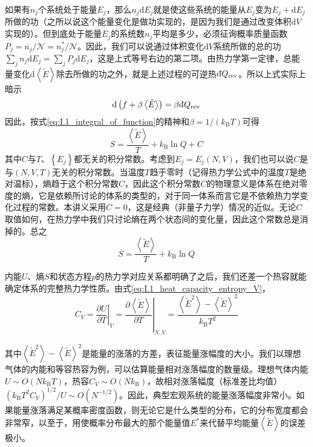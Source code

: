 \documentclass[main.tex]{subfiles}
\begin{document}
如果有$n_j$个系统处于能量$E_j$，那么$n_j\mathrm{d}E_j$就是使这些系统的能量从$E_j$变为$E_j+\mathrm{d}E_j$所做的功（之所以说这个能量变化是做功实现的，是因为我们是通过改变体积$\mathrm{d}V$实现的）。但到底处于能量$E_j$的系统数$n_j$平均是多少，必须征询概率质量函数$P_j=\overline{n_j}/\mathcal{N}=n_j^*/\mathcal{N}$。因此，我们可以说通过体积变化$\mathrm{d}V$系统所做的总的功$\sum_jn_j\mathrm{d}E_j=\sum_jP_j\mathrm{d}E_j$，这是上式等号右边的第二项。由热力学第一定律，总能量变化$\mathrm{d}\left\langle\tilde{E}\right\rangle$除去所做的功之外，就是上述过程的可逆热$\mathrm{d}\hspace*{-0.08em}\bar{}\hspace*{0.1em} Q_\text{rev}$。所以上式实际上暗示
\[\mathrm{d}\left(f+\beta\left\langle\tilde{E}\right\rangle\right)=\beta\mathrm{d}\hspace*{-0.08em}\bar{}\hspace*{0.1em} Q_\text{rev}\]
因此，按式\eqref{eq:I.1_integral_of_function}的精神和$\beta=1/\left(k_\text{B}T\right)$可得
\[S=\frac{\left\langle\tilde{E}\right\rangle}{T}+k_\text{B}\ln Q+C\]
其中$C$与$T$、$\left\{E_j\right\}$都无关的积分常数。考虑到$E_j=E_j\left(N,V\right)$，我们也可以说$C$是与$\left(N,V,T\right)$无关的积分常数。当温度$T$趋于零时（记得热力学公式中的温度$T$是绝对温标），熵趋于这个积分常数$C$，因此这个积分常数$C$的物理意义是体系在绝对零度的熵，它是依赖所讨论的体系的类型的，对于同一体系而言它是不依赖热力学变化过程的常数。本讲义采用$C=0$，这是经典（非量子力学）情况的近似。无论$C$取值如何，在热力学中我们只讨论熵在两个状态间的变化量，因此这个常数总是消掉的。总之
\[S=\frac{\left\langle\tilde{E}\right\rangle}{T}+k_\text{B}\ln Q\]

内能$U$、熵$S$和状态方程$p$的热力学对应关系都明确了之后，我们还差一个热容就能确定体系的完整热力学性质。由式\eqref{eq:I.1_heat_capacity_entropy_V}，
\[C_V=\left.\frac{\partial U}{\partial T}\right|_{V}=\left.\frac{\partial\left\langle\tilde{E}\right\rangle}{\partial T}\right|_{N,V}=\frac{\left\langle\tilde{E}^2\right\rangle-\left\langle\tilde{E}\right\rangle^2}{k_\text{B}T^2}\]

其中$\left\langle\tilde{E}^2\right\rangle-\left\langle\tilde{E}\right\rangle^2$是能量的涨落的方差，表征能量涨幅度的大小。我们以理想气体的内能和等容热容为例，可以估算能量相对涨落幅度的数量级。理想气体内能$U\sim O\left(Nk_\text{B}T\right)$，热容$C_V\sim O\left(Nk_\text{B}\right)$，故相对涨落幅度（标准差比均值）$\left(k_\text{B}T^2C_V\right)^{1/2}/U\sim O\left(N^{-1/2}\right)$。因此，典型宏观系统的能量涨落幅度非常小。如果能量涨落满足某概率密度函数，则无论它是什么类型的分布，它的分布宽度都会非常窄，以至于，用使概率分布最大的那个能量值$E^*$来代替平均能量$\left\langle\tilde{E}\right\rangle$的误差极小。
\end{document}
